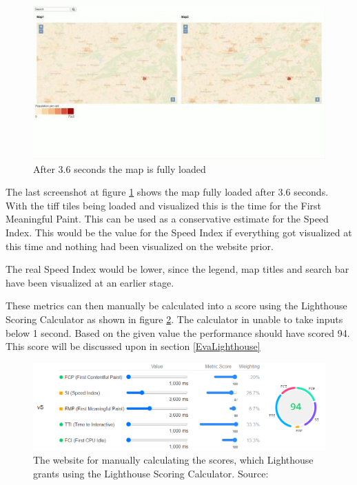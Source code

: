 \begin{figure} [H]
	\centering
	\includegraphics[width=.8\textwidth]{Pictures/ScreenshotLoading3}
	\caption{After 3.6 seconds the map is fully loaded}
	\label{ScreenshotLoading3}
\end{figure}

The last screenshot at figure \ref{ScreenshotLoading3} shows the map fully loaded after 3.6 seconds. With the tiff tiles being loaded and visualized this is the time for the First Meaningful Paint. This can be used as a conservative estimate for the Speed Index. This would be the value for the Speed Index if everything got visualized at this time and nothing had been visualized on the website prior.

The real Speed Index would be lower, since the legend, map titles and search bar have been visualized at an earlier stage. 

These metrics can then manually be calculated into a score using the Lighthouse Scoring Calculator as shown in figure \ref{ScoringManual}. The calculator in unable to take inputs below 1 second. Based on the given value the performance should have scored 94. This score will be discussed upon in section \ref{EvaLighthouse}


\begin{figure} [H]
	\centering
	\includegraphics[width=.9\textwidth]{Pictures/ScoringManual}
	\caption{The website for manually calculating the scores, which Lighthouse grants using the Lighthouse Scoring Calculator. Source: \citet{ScoreCalc}}
	\label{ScoringManual}
\end{figure}


